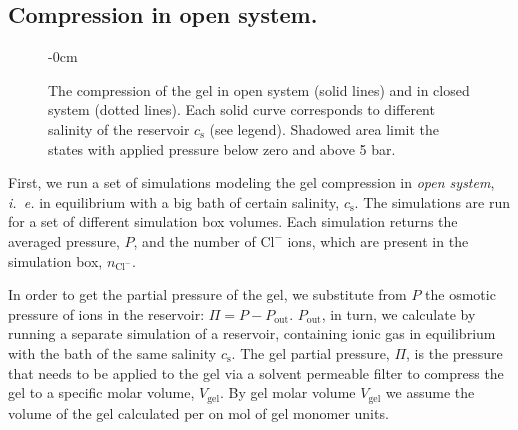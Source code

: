 \documentclass[journal,article,submit,pdftex,moreauthors]{Definitions/mdpi}
\newcommand{\ie}{\textit{i.~e.} }
\newcommand{\ncl}{n_\mathrm{Cl^-}}
\newcommand{\cl}{\mathrm{Cl^-}}
\newcommand{\cs}{c_{\mathrm{s}}}
\newcommand{\Vgel}{V_\mathrm{gel}}
\newcommand{\Pgel}{\Pi}
\newcommand{\Pout}{P_\mathrm{out}}
\begin{document}
\subsection{Compression in open system.}
\begin{figure}[h]
\begin{adjustwidth}{-\extralength}{0cm}
\hspace{0.02\textwidth}
\caption{
The compression of the gel in open system (solid lines) and in closed system (dotted lines). 
Each solid curve corresponds to different salinity of the reservoir $\cs$ (see legend). Shadowed area limit the states with applied pressure below zero and above 5 bar.\label{fig: PV and CV}}
\end{adjustwidth}
\end{figure}
First, we run a set of simulations modeling the gel compression in \emph{open system}, \ie in equilibrium with a big bath of certain salinity, $\cs$. 
The simulations are run for a set of different simulation box volumes. 
Each simulation returns the averaged pressure, $P$, and the number of $\cl$ ions, which are present in the simulation box, $\ncl$. 

In order to get the partial pressure of the gel, we substitute from $P$ the osmotic pressure of ions in the reservoir: $\Pgel=P - \Pout$.
$\Pout$, in turn, we calculate by running a separate simulation of a reservoir, containing ionic gas in equilibrium with the bath of the same salinity $\cs$. 
The gel partial pressure, $\Pgel$, is the pressure that needs to be applied to the gel via a solvent permeable filter to compress the gel to a specific molar volume, $\Vgel$. 
By gel molar volume $\Vgel$ we assume the volume of the gel calculated per on mol of gel monomer units.
\end{document}
